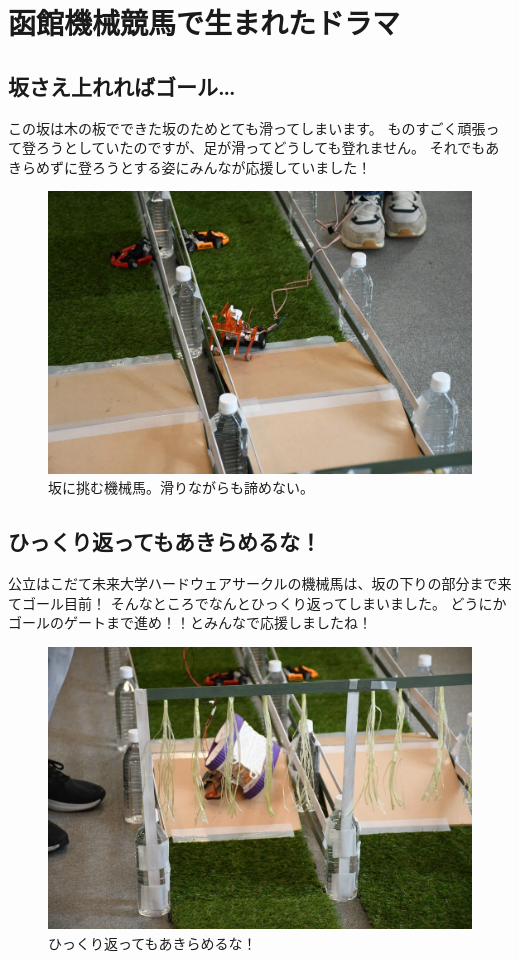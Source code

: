 \section{函館機械競馬で生まれたドラマ}
\subsection{坂さえ上れればゴール…}
この坂は木の板でできた坂のためとても滑ってしまいます。  
ものすごく頑張って登ろうとしていたのですが、足が滑ってどうしても登れません。  
それでもあきらめずに登ろうとする姿にみんなが応援していました！

\begin{figure}[h]
\centering
\includegraphics[width=0.7\linewidth]{pages/images/slope.png}
\caption{坂に挑む機械馬。滑りながらも諦めない。}
\end{figure}

\clearpage

\subsection{ひっくり返ってもあきらめるな！}
公立はこだて未来大学ハードウェアサークルの機械馬は、坂の下りの部分まで来てゴール目前！  
そんなところでなんとひっくり返ってしまいました。  
どうにかゴールのゲートまで進め！！とみんなで応援しましたね！

\begin{figure}[h]
\centering
\includegraphics[width=0.7\linewidth]{pages/images/reverse.png}
\caption{ひっくり返ってもあきらめるな！}
\end{figure}

